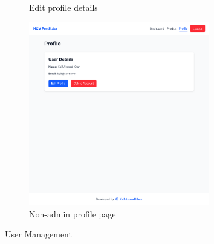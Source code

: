 \begin{figure}[htbp]
\begin{subfigure}{0.5\textwidth}
    \caption{Edit profile details}
    \label{fig:edit}
  \end{subfigure}
  \begin{subfigure}{0.5\textwidth}
    \includegraphics[width=0.9\linewidth, height=8cm]{figures/site/normaluser.png}
    \caption{Non-admin profile page}
    \label{fig:detail}
  \end{subfigure}
  \caption{User Management}
  \label{fig:image3}
\end{figure}

